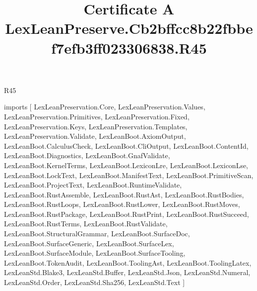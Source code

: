 \begin{lexlean}{R45}
\title{Certificate A LexLeanPreserve.Cb2bffcc8b22fbbef7efb3ff023306838.R45}
\begin{coremodule}
imports [
  LexLeanPreservation.Core,
  LexLeanPreservation.Values,
  LexLeanPreservation.Primitives,
  LexLeanPreservation.Fixed,
  LexLeanPreservation.Keys,
  LexLeanPreservation.Templates,
  LexLeanPreservation.Validate,
  LexLeanBoot.AxiomOutput,
  LexLeanBoot.CalculusCheck,
  LexLeanBoot.CliOutput,
  LexLeanBoot.ContentId,
  LexLeanBoot.Diagnostics,
  LexLeanBoot.GnafValidate,
  LexLeanBoot.KernelTerms,
  LexLeanBoot.LexiconLre,
  LexLeanBoot.LexiconLse,
  LexLeanBoot.LockText,
  LexLeanBoot.ManifestText,
  LexLeanBoot.PrimitiveScan,
  LexLeanBoot.ProjectText,
  LexLeanBoot.RuntimeValidate,
  LexLeanBoot.RustAssemble,
  LexLeanBoot.RustAst,
  LexLeanBoot.RustBodies,
  LexLeanBoot.RustLoops,
  LexLeanBoot.RustLower,
  LexLeanBoot.RustMoves,
  LexLeanBoot.RustPackage,
  LexLeanBoot.RustPrint,
  LexLeanBoot.RustSucceed,
  LexLeanBoot.RustTerms,
  LexLeanBoot.RustValidate,
  LexLeanBoot.StructuralGrammar,
  LexLeanBoot.SurfaceDoc,
  LexLeanBoot.SurfaceGeneric,
  LexLeanBoot.SurfaceLex,
  LexLeanBoot.SurfaceModule,
  LexLeanBoot.SurfaceTooling,
  LexLeanBoot.TokenAudit,
  LexLeanBoot.ToolingAst,
  LexLeanBoot.ToolingLatex,
  LexLeanStd.Blake3,
  LexLeanStd.Buffer,
  LexLeanStd.Json,
  LexLeanStd.Numeral,
  LexLeanStd.Order,
  LexLeanStd.Sha256,
  LexLeanStd.Text
]


\end{coremodule}
\end{lexlean}
